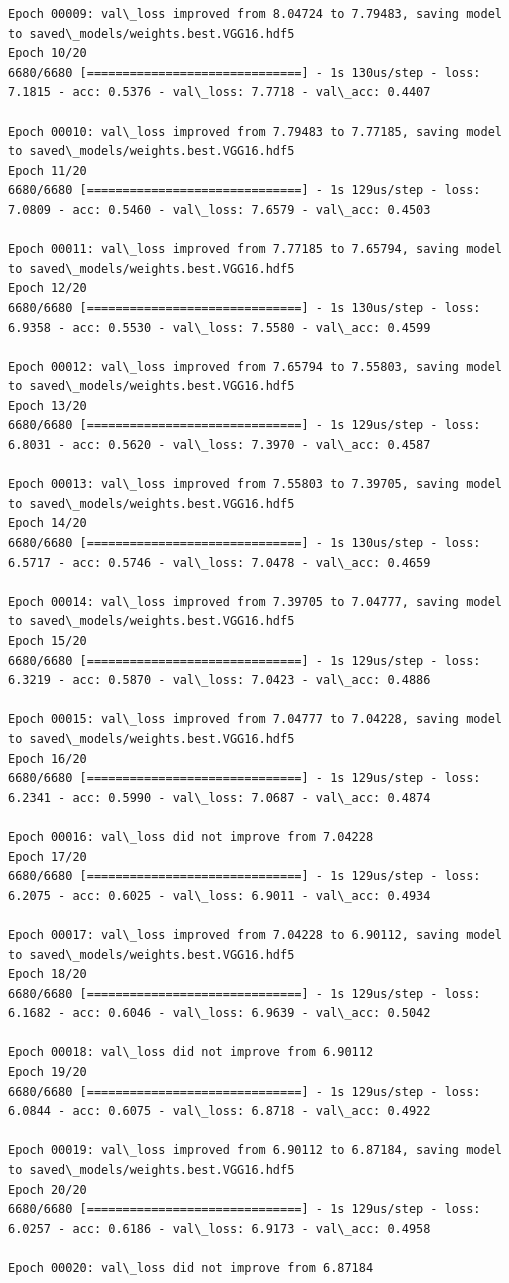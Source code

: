\documentclass[11pt]{article}
\begin{document}
\begin{Verbatim}[commandchars=\\\{\}]
Epoch 00009: val\_loss improved from 8.04724 to 7.79483, saving model to saved\_models/weights.best.VGG16.hdf5
Epoch 10/20
6680/6680 [==============================] - 1s 130us/step - loss: 7.1815 - acc: 0.5376 - val\_loss: 7.7718 - val\_acc: 0.4407

Epoch 00010: val\_loss improved from 7.79483 to 7.77185, saving model to saved\_models/weights.best.VGG16.hdf5
Epoch 11/20
6680/6680 [==============================] - 1s 129us/step - loss: 7.0809 - acc: 0.5460 - val\_loss: 7.6579 - val\_acc: 0.4503

Epoch 00011: val\_loss improved from 7.77185 to 7.65794, saving model to saved\_models/weights.best.VGG16.hdf5
Epoch 12/20
6680/6680 [==============================] - 1s 130us/step - loss: 6.9358 - acc: 0.5530 - val\_loss: 7.5580 - val\_acc: 0.4599

Epoch 00012: val\_loss improved from 7.65794 to 7.55803, saving model to saved\_models/weights.best.VGG16.hdf5
Epoch 13/20
6680/6680 [==============================] - 1s 129us/step - loss: 6.8031 - acc: 0.5620 - val\_loss: 7.3970 - val\_acc: 0.4587

Epoch 00013: val\_loss improved from 7.55803 to 7.39705, saving model to saved\_models/weights.best.VGG16.hdf5
Epoch 14/20
6680/6680 [==============================] - 1s 130us/step - loss: 6.5717 - acc: 0.5746 - val\_loss: 7.0478 - val\_acc: 0.4659

Epoch 00014: val\_loss improved from 7.39705 to 7.04777, saving model to saved\_models/weights.best.VGG16.hdf5
Epoch 15/20
6680/6680 [==============================] - 1s 129us/step - loss: 6.3219 - acc: 0.5870 - val\_loss: 7.0423 - val\_acc: 0.4886

Epoch 00015: val\_loss improved from 7.04777 to 7.04228, saving model to saved\_models/weights.best.VGG16.hdf5
Epoch 16/20
6680/6680 [==============================] - 1s 129us/step - loss: 6.2341 - acc: 0.5990 - val\_loss: 7.0687 - val\_acc: 0.4874

Epoch 00016: val\_loss did not improve from 7.04228
Epoch 17/20
6680/6680 [==============================] - 1s 129us/step - loss: 6.2075 - acc: 0.6025 - val\_loss: 6.9011 - val\_acc: 0.4934

Epoch 00017: val\_loss improved from 7.04228 to 6.90112, saving model to saved\_models/weights.best.VGG16.hdf5
Epoch 18/20
6680/6680 [==============================] - 1s 129us/step - loss: 6.1682 - acc: 0.6046 - val\_loss: 6.9639 - val\_acc: 0.5042

Epoch 00018: val\_loss did not improve from 6.90112
Epoch 19/20
6680/6680 [==============================] - 1s 129us/step - loss: 6.0844 - acc: 0.6075 - val\_loss: 6.8718 - val\_acc: 0.4922

Epoch 00019: val\_loss improved from 6.90112 to 6.87184, saving model to saved\_models/weights.best.VGG16.hdf5
Epoch 20/20
6680/6680 [==============================] - 1s 129us/step - loss: 6.0257 - acc: 0.6186 - val\_loss: 6.9173 - val\_acc: 0.4958

Epoch 00020: val\_loss did not improve from 6.87184

    \end{Verbatim}
\end{document}
